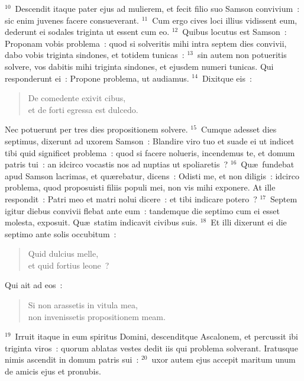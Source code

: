 ${}^{10}$~Descendit itaque pater ejus ad mulierem, et fecit filio suo Samson convivium~: sic enim juvenes facere consueverant.
${}^{11}$~Cum ergo cives loci illius vidissent eum, dederunt ei sodales triginta ut essent cum eo.
${}^{12}$~Quibus locutus est Samson~: Proponam vobis problema~: quod si solveritis mihi intra septem dies convivii, dabo vobis triginta sindones, et totidem tunicas~:
${}^{13}$~sin autem non potueritis solvere, vos dabitis mihi triginta sindones, et ejusdem numeri tunicas. Qui responderunt ei~: Propone problema, ut audiamus.
${}^{14}$~Dixitque eis~: \begin{verse}De comedente exivit cibus,\\ et de forti egressa est dulcedo.\end{verse}

 Nec potuerunt per tres dies propositionem solvere.
${}^{15}$~Cumque adesset dies septimus, dixerunt ad uxorem Samson~: Blandire viro tuo et suade ei ut indicet tibi quid significet problema~: quod si facere nolueris, incendemus te, et domum patris tui~: an idcirco vocastis nos ad nuptias ut spoliaretis~?
${}^{16}$~Qu\ae\ fundebat apud Samson lacrimas, et qu\ae rebatur, dicens~: Odisti me, et non diligis~: idcirco problema, quod proposuisti filiis populi mei, non vis mihi exponere. At ille respondit~: Patri meo et matri nolui dicere~: et tibi indicare potero~?
${}^{17}$~Septem igitur diebus convivii flebat ante eum~: tandemque die septimo cum ei esset molesta, exposuit. Qu\ae\ statim indicavit civibus suis.
${}^{18}$~Et illi dixerunt ei die septimo ante solis occubitum~: \begin{verse}Quid dulcius melle,\\ et quid fortius leone~?\end{verse}

 Qui ait ad eos~: \begin{verse}Si non arassetis in vitula mea,\\ non invenissetis propositionem meam.\end{verse}


${}^{19}$~Irruit itaque in eum spiritus Domini, descenditque Ascalonem, et percussit ibi triginta viros~: quorum ablatas vestes dedit iis qui problema solverant. Iratusque nimis ascendit in domum patris sui~:
${}^{20}$~uxor autem ejus accepit maritum unum de amicis ejus et pronubis.

